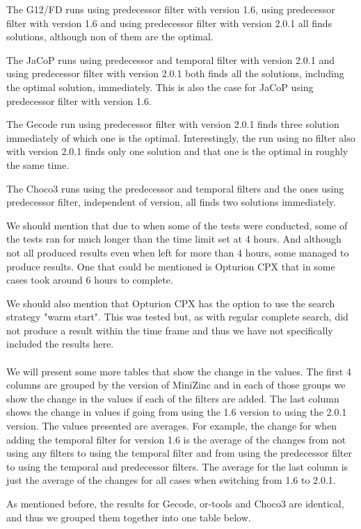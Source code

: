 The G12/FD runs using predecessor filter with version 1.6, using predecessor filter with version 1.6 and using predecessor filter with version 2.0.1 all finds solutions, although non of them are the optimal.

The JaCoP runs using predecessor and temporal filter with version 2.0.1 and using predecessor filter with version 2.0.1 both finds all the solutions, including the optimal solution, immediately. This is also the case for JaCoP using predecessor filter with version 1.6.

The Gecode run using predecessor filter with version 2.0.1 finds three solution immediately of which one is the optimal. Interestingly, the run using no filter also with version 2.0.1 finds only one solution and that one is the optimal in roughly the same time.

The Choco3 runs using the predecessor and temporal filters and the ones using predecessor filter, independent of version, all finds two solutions immediately.

We should mention that due to when some of the tests were conducted, some of the tests ran for much longer than the time limit set at 4 hours. And although not all produced results even when left for more than 4 hours, some managed to produce results. One that could be mentioned is Opturion CPX that in some cases took around 6 hours to complete.

We should also mention that Opturion CPX has the option to use the search strategy "warm start". This was tested but, as with regular complete search, did not produce a result within the time frame and thus we have not specifically included the results here.
\\\\
We will present some more tables that show the change in the values. The first 4 columns are grouped by the version of MiniZinc and in each of those groups we show the change in the values if each of the filters are added. The last column shows the change in values if going from using the 1.6 version to using the 2.0.1 version. The values presented are averages. For example, the change for when adding the temporal filter for version 1.6 is the average of the changes from not using any filters to using the temporal filter and from using the predecessor filter to using the temporal and predecessor filters. The average for the last column is just the average of the changes for all cases when switching from 1.6 to 2.0.1.

As mentioned before, the results for Gecode, or-tools and Choco3 are identical, and thus we grouped them together into one table below.

